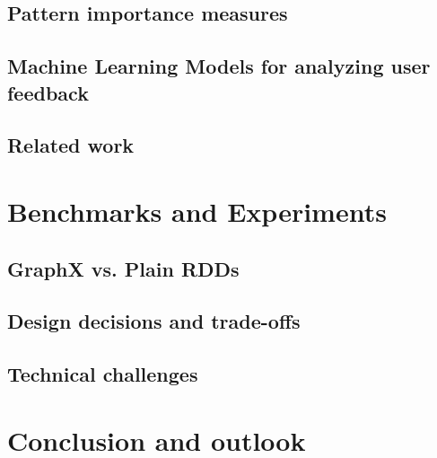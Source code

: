 \documentclass[
        a4paper,     %
        titlepage,   %
        oneside,     %
        parskip      %
        ]{scrartcl}  %
\begin{document}
    \subsection{Pattern importance measures}
    \subsection{Machine Learning Models for analyzing user feedback}
    \subsection{Related work}
    \pagebreak

  \section{Benchmarks and Experiments}
    \subsection{GraphX vs. Plain RDDs}
    \subsection{Design decisions and trade-offs}
    \subsection{Technical challenges}
    \pagebreak

  \section{Conclusion and outlook}

  \clearpage
  
\end{document}
